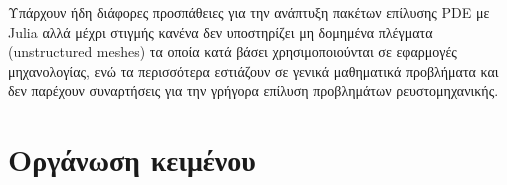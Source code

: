 Υπάρχουν ήδη διάφορες προσπάθειες για την ανάπτυξη πακέτων επίλυσης PDE με Julia αλλά μέχρι στιγμής κανένα δεν υποστηρίζει μη δομημένα πλέγματα (unstructured meshes) τα οποία κατά βάσει χρησιμοποιούνται σε εφαρμογές μηχανολογίας, ενώ τα περισσότερα εστιάζουν σε γενικά μαθηματικά προβλήματα και δεν παρέχουν συναρτήσεις για την γρήγορα επίλυση προβλημάτων ρευστομηχανικής.


\section{Οργάνωση κειμένου}


